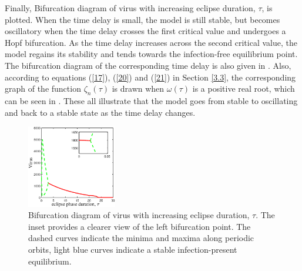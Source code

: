 \documentclass{CMHPhD-SIVD}
\begin{document}
Finally, Bifurcation diagram of virus with increasing eclipse duration, $\tau$, is plotted. When the time delay is small, the model is still stable, but becomes oscillatory when the time delay crosses the first critical value and undergoes a Hopf bifurcation. As the time delay increases across the second critical value, the model regains its stability and tends towards the infection-free equilibrium point. The bifurcation diagram of the corresponding time delay is also given in . Also, according to equations (\ref{17}), (\ref{20}) and (\ref{21}) in Section \ref{3.3}, the corresponding graph of the function $\zeta_n(\tau)$ is drawn when $\omega(\tau)$ is a positive real root, which can be seen in . These all illustrate that the model goes from stable to oscillating and back to a stable state as the time delay changes.



\begin{figure}[h!]
\centering
\includegraphics[height=0.2\textheight,width=0.35\textwidth]{J5.eps}
\vspace{3mm}
\caption{Bifurcation diagram of virus with increasing eclipse duration, $\tau$. The inset provides a clearer view of the left bifurcation point. The dashed curves indicate the minima and maxima along periodic orbits, light blue curves indicate a stable infection-present equilibrium.}
\label{Fig.3}
\end{figure}
\end{document}
